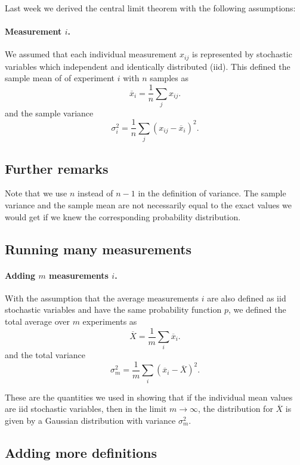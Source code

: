 \documentclass[%
oneside,                 %
final,                   %
10pt]{article}
\begin{document}
Last week we derived the central limit theorem with the following assumptions:


\paragraph{Measurement $i$.}
We assumed that each individual measurement $x_{ij}$ is represented by stochastic variables which independent and identically distributed (iid).
This defined the sample mean of of experiment $i$ with $n$ samples as
\[
\overline{x}_i=\frac{1}{n}\sum_{j} x_{ij}.
\]
and the sample variance
\[
\sigma^2_i=\frac{1}{n}\sum_{j} \left(x_{ij}-\overline{x}_i\right)^2.
\]



\subsection*{Further remarks}

Note that we use $n$ instead of $n-1$ in the definition of
variance. The sample variance and the sample mean are not necessarily equal to
the exact values we would get if we knew the corresponding probability
distribution.

\subsection*{Running many measurements}


\paragraph{Adding $m$ measurements $i$.}
With the assumption that the average measurements $i$ are also defined as  iid stochastic variables and have the same probability function $p$,
we defined the total average over $m$ experiments as
\[
\overline{X}=\frac{1}{m}\sum_{i} \overline{x}_{i}.
\]
and the total variance
\[
\sigma^2_{m}=\frac{1}{m}\sum_{i} \left( \overline{x}_{i}-\overline{X}\right)^2.
\]


These are the quantities we used in showing that if the individual mean values are iid stochastic variables, then in the limit $m\rightarrow \infty$, the distribution for $\overline{X}$ is given by a Gaussian distribution with variance $\sigma^2_m$.

\subsection*{Adding more definitions}
\end{document}
